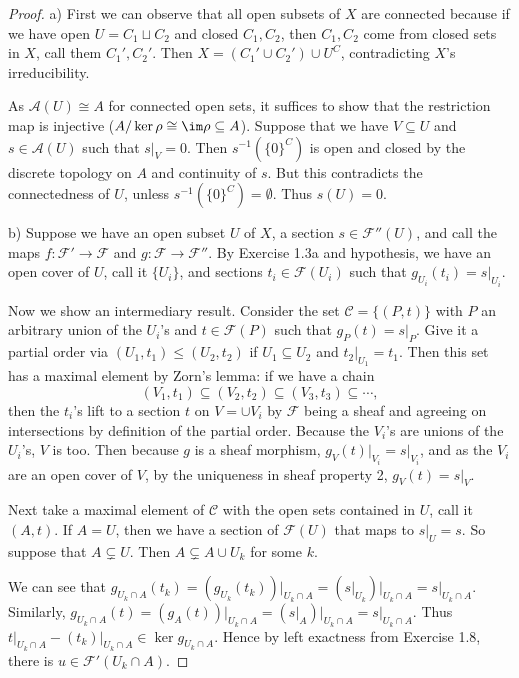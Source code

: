 \begin{proof}
	a) First we can observe that all open subsets of $X $ are connected because if we have open $U = C_{1} \sqcup C_{2} $ and closed $C_{1},C_{2} $, then $C_{1},C_{2} $ come from closed sets in $X $, call them $C_{1}',C_{2}' $.
	Then $X = (C_{1}'\cup C_{2}') \cup U^C $, contradicting $X $'s irreducibility.

	As $\mathscr{A}(U) \cong A $ for connected open sets, it suffices to show that the restriction map is injective ($A / \ker \rho \cong \im \rho \subseteq A$).
	Suppose that we have $V \subseteq U $ and $s \in \mathscr{A}(U)$ such that $s|_V = 0$.
	Then $s ^{-1}(\{0\} ^C)  $ is open and closed by the discrete topology on $A $ and continuity of $s $.
	But this contradicts the connectedness of $U $, unless $s ^{-1}(\{0\} ^C) = \emptyset  $.
	Thus $s(U) = 0 $.

	b) 
	Suppose we have an open subset $U $ of $X $, a section $s \in \mathscr{F}''(U) $, and call the maps $f: \mathscr{F}' \to \mathscr{F} $ and $g: \mathscr{F}\to \mathscr{F}'' $.
	By Exercise 1.3a and hypothesis, we have an open cover of $U$, call it $\{U_i\}   $, and sections $t_i \in \mathscr{F}(U_i)$ such that $g_{U_i}(t_i) = s\big|_{U_i}$.

	Now we show an intermediary result. 
	Consider the set $\mathscr{C} = \{(P,t)\}   $ with $P $ an arbitrary union of the $U_i $'s and $t \in \mathscr{F}(P) $ such that $g_P(t) = s|_P $.
	Give it a partial order via $(U_{1},t_{1}) \le (U_{2},t_{2}) $ if $U_{1}\subseteq U_{2} $ and $t_{2}\big|_{U_{1}} = t_{1} $.
	Then this set has a maximal element by Zorn's lemma:
	if we have a chain
	\[
		(V_{1},t_{1}) \subseteq (V_{2},t_{2}) \subseteq (V_{3},t_{3}) \subseteq \cdots
	,\] 
	then the $t_i $'s lift to a section $t $ on $V = \cup V_i $ by $\mathscr{F} $ being a sheaf and agreeing on intersections by definition of the partial order.
	Because the $V_i $'s are unions of the $U_i $'s, $V $ is too.
	Then because $g $ is a sheaf morphism, $g_V(t)\big|_{V_i} = s\big|_{V_i} $, and as the $V_i $ are an open cover of $V $, by the uniqueness in sheaf property 2, $g_V(t) = s\big|_{V} $.

	Next take a maximal element of $\mathscr{C} $ with the open sets contained in $U $, call it $(A,t) $.
	If $A = U $, then we have a section of $\mathscr{F}(U) $ that maps to $s|_U = s $.
	So suppose that $A \subsetneq U $.
	Then $A \subsetneq A \cup U_k $ for some $k $.

	We can see that $g_{U_k\cap A}(t_k) = (g_{U_k}(t_k))\big|_{U_k\cap A} = (s\big|_{U_k})\big|_{U_k\cap A} = s\big|_{U_k\cap A}$.
	Similarly, $g_{U_k\cap A}(t) = (g_{A}(t))\big|_{U_k\cap A} = (s\big|_{A})\big|_{U_k\cap A} = s\big|_{U_k\cap A} $.
	Thus $t\big|_{U_k\cap A}-(t_k)\big|_{U_k\cap A} \in \ker g_{U_k\cap A} $.
	Hence by left exactness from Exercise 1.8, there is $u\in \mathscr{F}'(U_k\cap A) $.
	

\end{proof}

